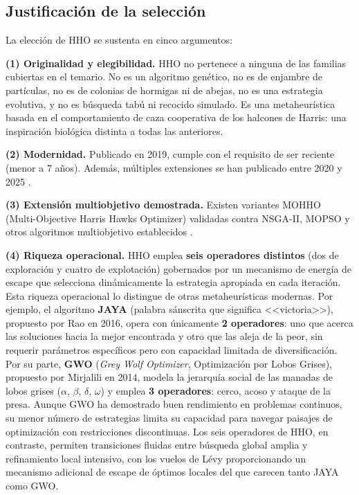 \documentclass[12pt,letterpaper]{article}
\begin{document}
\subsection{Justificación de la selección}

La elección de HHO se sustenta en cinco argumentos:

\textbf{(1) Originalidad y elegibilidad.} HHO no pertenece a ninguna de las familias cubiertas en el temario. No es un algoritmo genético, no es de enjambre de partículas, no es de colonias de hormigas ni de abejas, no es una estrategia evolutiva, y no es búsqueda tabú ni recocido simulado. Es una metaheurística basada en el comportamiento de caza cooperativa de los halcones de Harris: una inspiración biológica distinta a todas las anteriores.

\textbf{(2) Modernidad.} Publicado en 2019, cumple con el requisito de ser reciente (menor a 7 años). Además, múltiples extensiones se han publicado entre 2020 y 2025 \parencite{kusoglu2020, cerci2022, zhang2023}.

\textbf{(3) Extensión multiobjetivo demostrada.} Existen variantes MOHHO (Multi-Objective Harris Hawks Optimizer) validadas contra NSGA-II, MOPSO y otros algoritmos multiobjetivo establecidos \parencite{kusoglu2020, cerci2022, liwu2023}.

\textbf{(4) Riqueza operacional.} HHO emplea \textbf{seis operadores distintos} (dos de exploración y cuatro de explotación) gobernados por un mecanismo de energía de escape que selecciona dinámicamente la estrategia apropiada en cada iteración. Esta riqueza operacional lo distingue de otras metaheurísticas modernas. Por ejemplo, el algoritmo \textbf{JAYA} (palabra sánscrita que significa <<victoria>>), propuesto por Rao en 2016, opera con únicamente \textbf{2 operadores}: uno que acerca las soluciones hacia la mejor encontrada y otro que las aleja de la peor, sin requerir parámetros específicos pero con capacidad limitada de diversificación. Por su parte, \textbf{GWO} (\textit{Grey Wolf Optimizer}, Optimización por Lobos Grises), propuesto por Mirjalili en 2014, modela la jerarquía social de las manadas de lobos grises ($\alpha$, $\beta$, $\delta$, $\omega$) y emplea \textbf{3 operadores}: cerco, acoso y ataque de la presa. Aunque GWO ha demostrado buen rendimiento en problemas continuos, su menor número de estrategias limita su capacidad para navegar paisajes de optimización con restricciones discontinuas. Los seis operadores de HHO, en contraste, permiten transiciones fluidas entre búsqueda global amplia y refinamiento local intensivo, con los vuelos de Lévy proporcionando un mecanismo adicional de escape de óptimos locales del que carecen tanto JAYA como GWO.
\end{document}
